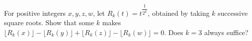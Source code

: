 For positive integers $x,y,z,w$, let $R_k(t)=t^{\dfrac{1}{2^k}}$, obtained by taking $k$ successive square roots. Show that some $k$ makes $\lfloor R_k(x)\rfloor-\lfloor R_k(y)\rfloor+\lfloor R_k(z)\rfloor-\lfloor R_k(w)\rfloor=0$. Does $k=3$ always suffice?
